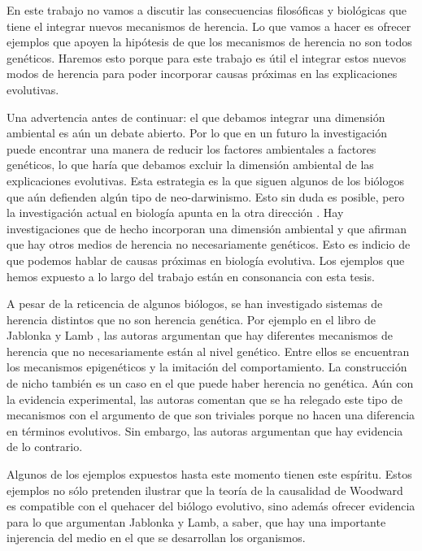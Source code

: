 En este trabajo no vamos a discutir las consecuencias filosóficas y biológicas que tiene el integrar nuevos mecanismos de herencia. Lo que vamos a hacer es ofrecer ejemplos que apoyen la hipótesis de que los mecanismos de herencia no son todos genéticos. Haremos esto porque para este trabajo es útil el integrar estos nuevos modos de herencia para poder incorporar causas próximas en las explicaciones evolutivas.

Una advertencia antes de continuar: el que debamos integrar una dimensión ambiental es aún un debate abierto. Por lo que en un futuro la investigación puede encontrar una manera de reducir los factores ambientales a factores genéticos, lo que haría que debamos excluir la dimensión ambiental de las explicaciones evolutivas. Esta estrategia es la que siguen algunos de los biólogos que aún defienden algún tipo de neo-darwinismo. Esto sin duda es posible, pero la investigación actual en biología apunta en la otra dirección  \cite{Bateson2014}. Hay investigaciones que de hecho incorporan una dimensión ambiental y que afirman que hay otros medios de herencia no necesariamente genéticos. Esto es indicio de que podemos hablar de causas próximas en biología evolutiva. Los ejemplos que hemos expuesto a lo largo del trabajo están en consonancia con esta tesis.

A pesar de la reticencia de algunos biólogos, se han investigado sistemas de herencia distintos que no son herencia genética. Por ejemplo en el libro de Jablonka y Lamb \citeyear{Jablonka2020}, las autoras argumentan que hay diferentes mecanismos de herencia que no necesariamente están al nivel genético. Entre ellos se encuentran los mecanismos epigenéticos y la imitación del comportamiento. La construcción de nicho también es un caso en el que puede haber herencia no genética. Aún con la evidencia experimental, las autoras comentan que se ha relegado este tipo de mecanismos con el argumento de que son triviales porque no hacen una diferencia en términos evolutivos. Sin embargo, las autoras argumentan que hay evidencia de lo contrario.

Algunos de los ejemplos expuestos hasta este momento tienen este espíritu. Estos ejemplos no sólo pretenden ilustrar que la teoría de la causalidad de Woodward es compatible con el quehacer del biólogo evolutivo, sino además ofrecer evidencia para lo que argumentan Jablonka y Lamb, a saber, que hay una importante injerencia del medio en el que se desarrollan los organismos.

